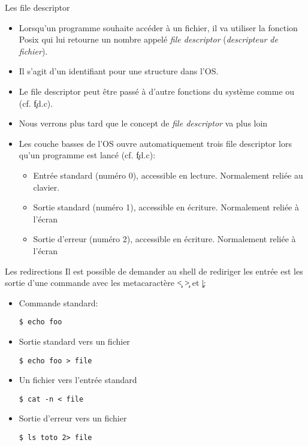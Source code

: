 \begin{frame}[fragile=singleslide]{Les file descriptor}
  \begin{itemize}
  \item  Lorsqu'un programme  souhaite  accéder à  un  fichier, il  va
    utiliser  la  fonction Posix    qui  lui retourne  un
    nombre   appelé  \emph{file  descriptor}   (\emph{descripteur  de
      fichier}).
  \item Il s'agit d'un identifiant pour une structure dans l'OS.
  \item  Le file  descriptor peut  être passé  à d'autre  fonctions du
    système comme  ou  (cf. \c{fd.c}).
  \item  Nous   verrons  plus  tard  que  le   concept  de  \emph{file
      descriptor} va plus loin
  \item  Les couche basses  de l'OS  ouvre automatiquement  trois file
  descriptor lors qu'un programme est lancé (cf. \c{fd.c}):
    \begin{itemize}
    \item    Entrée    standard     (numéro    0),    accessible    en
      lecture. Normalement reliée au clavier.
    \item    Sortie    standard     (numéro    1),    accessible    en
      écriture. Normalement reliée à l'écran
    \item    Sortie    d'erreur     (numéro    2),    accessible    en
      écriture. Normalement reliée à l'écran
    \end{itemize}
  \end{itemize}
\end{frame}

\begin{frame}[fragile=singleslide]{Les redirections}
  Il est possible de demander au shell de rediriger les entrée est les
  sortie d'une commande avec les metacaractère \c{<} \c{>} et \c{|}:
  \begin{itemize}
  \item Commande standard:
    \begin{lstlisting}
$ echo foo
    \end{lstlisting}
  \item Sortie standard vers un fichier
    \begin{lstlisting}
$ echo foo > file
    \end{lstlisting}
  \item Un fichier vers l'entrée standard
    \begin{lstlisting}
$ cat -n < file
    \end{lstlisting} %
  \item Sortie d'erreur vers un fichier
    \begin{lstlisting}
$ ls toto 2> file
    \end{lstlisting} %
  \end{itemize}
\end{frame}

